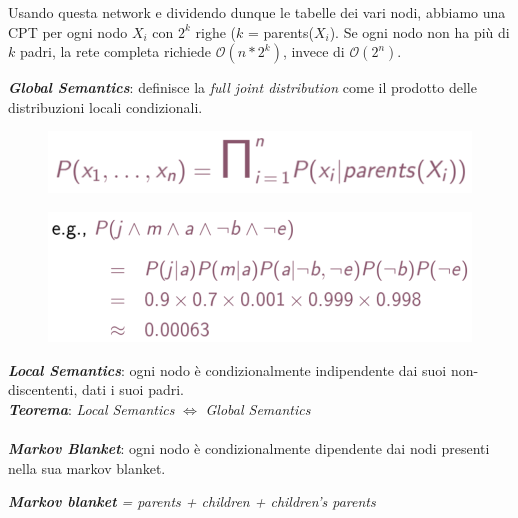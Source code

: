 \documentclass[a4paper, notitlepage, 9pt]{extreport}
\begin{document}
\noindent
Usando questa network e dividendo dunque le tabelle dei vari nodi, abbiamo una CPT per ogni nodo $X_i$ con $2^k$ righe ($k$ = parents($X_i$). Se ogni nodo non ha più di $k$ padri, la rete completa richiede $\mathcal{O}(n * 2^k)$, invece di $\mathcal{O}(2^n)$.
\begin{multicols}{2}
	\noindent
	\textit{\textbf{Global Semantics}}: definisce la \textit{full joint distribution} come il prodotto delle distribuzioni locali condizionali.
	\begin{figure}[H]
		\centering
		\includegraphics[scale=0.42]{BN1}
	\end{figure}
	\columnbreak
	\begin{figure}[H]
		\centering
		\includegraphics[scale=0.42]{BN2}
	\end{figure}
\end{multicols}

\noindent
\textit{\textbf{Local Semantics}}: ogni nodo è condizionalmente indipendente dai suoi non-discententi, dati i suoi padri.\\
\textit{\textbf{Teorema}}: \textit{Local Semantics} $\iff$ \textit{Global Semantics}\\\\
\textit{\textbf{Markov Blanket}}: ogni nodo è condizionalmente dipendente dai nodi presenti nella sua markov blanket.
\begin{center}
\textit{\textbf{Markov blanket} = parents + children + children's parents}
\end{center}
\end{document}
